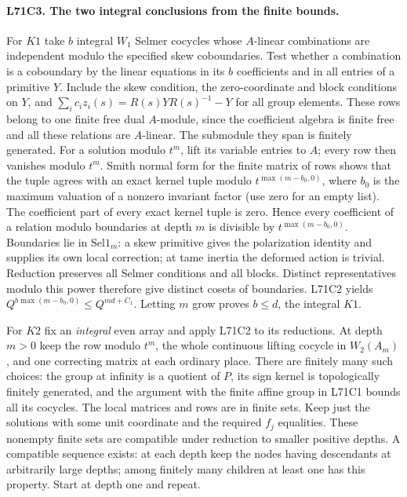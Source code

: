 \paragraph{L71C3. The two integral conclusions from the finite bounds.}
For $K1$ take $b$ integral $W_1$ Selmer cocycles whose $A$-linear
combinations are independent modulo the specified skew
coboundaries. Test whether a combination is a coboundary by the
linear equations in its $b$ coefficients and in all entries of
a primitive $Y$. Include the skew condition, the zero-coordinate
and block conditions on $Y$, and
$\sum_i c_i z_i(s)=R(s)YR(s)^{-1}-Y$ for all group elements.
These rows belong to one finite free dual $A$-module, since the
coefficient algebra is finite free and all these relations are
$A$-linear. The submodule they span is finitely generated.
For a solution modulo $t^m$, lift its variable entries to $A$;
every row then vanishes modulo $t^m$. Smith normal form for the
finite matrix of rows shows that the tuple agrees with an exact
kernel tuple modulo $t^{\max(m-b_0,0)}$, where $b_0$ is the
maximum valuation of a nonzero invariant factor (use zero for
an empty list). The coefficient part of every exact kernel
tuple is zero. Hence every coefficient of a relation modulo
boundaries at depth $m$ is divisible by $t^{\max(m-b_0,0)}$.
Boundaries lie in $\mathrm{Sel1}_m$: a skew primitive gives the
polarization identity and supplies its own local correction;
at tame inertia the deformed action is trivial. Reduction preserves
all Selmer conditions and all blocks. Distinct representatives
modulo this power therefore give distinct cosets of boundaries.
L71C2 yields $Q^{b\max(m-b_0,0)}\le Q^{md+C_1}$. Letting
$m$ grow proves $b\le d$, the integral $K1$.

For $K2$ fix an \emph{integral} even array and apply L71C2
to its reductions. At depth $m>0$ keep the row modulo $t^m$,
the whole continuous lifting cocycle in $W_2(A_m)$, and one
correcting matrix at each ordinary place. There are finitely
many such choices: the group at infinity is a quotient of $P$,
its sign kernel is topologically finitely generated, and the
argument with the finite affine group in L71C1 bounds all its
cocycles. The local matrices and rows are in finite sets.
Keep just the solutions with some unit coordinate and the
required $f_j$ equalities. These nonempty finite sets are
compatible under reduction to smaller positive depths. A compatible
sequence exists: at each depth keep the nodes having descendants
at arbitrarily large depths; among finitely many children at least
one has this property. Start at depth one and repeat.

